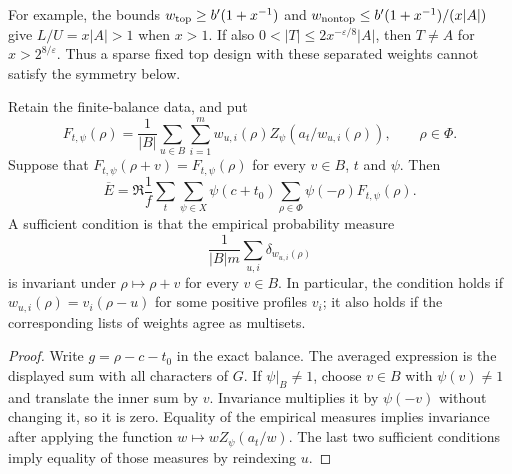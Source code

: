 For example, the bounds
$w_{\rm top}\ge b'(1+x^{-1})$ and
$w_{\rm nontop}\le b'(1+x^{-1})/(x|A|)$
give $L/U=x|A|>1$ when $x>1$.
If also $0<|T|\le2x^{-\varepsilon/8}|A|$, then $T\ne A$
for $x>2^{8/\varepsilon}$. Thus a sparse fixed top design with these
separated weights cannot satisfy the symmetry below.

\begin{lemma}
\label{cs-translation-symmetry}
Retain the finite-balance data, and put
\[
 F_{t,\psi}(\rho)=\frac1{|B|}\sum_{u\in B}\sum_{i=1}^m
 w_{u,i}(\rho)Z_\psi(a_t/w_{u,i}(\rho)),\qquad \rho\in\Phi.
\]
Suppose that $F_{t,\psi}(\rho+v)=F_{t,\psi}(\rho)$ for every
$v\in B$, $t$ and $\psi$. Then
\[
 \overline E=\Re\frac1f\sum_t\sum_{\psi\in X}\psi(c+t_0)
                   \sum_{\rho\in\Phi}\psi(-\rho)F_{t,\psi}(\rho).
\]
A sufficient condition is that the empirical probability measure
\[
 \frac1{|B|m}\sum_{u,i}\delta_{w_{u,i}(\rho)}
\]
is invariant under $\rho\mapsto\rho+v$ for every $v\in B$.
In particular, the condition holds if
$w_{u,i}(\rho)=v_i(\rho-u)$ for some positive profiles $v_i$;
it also holds if the corresponding lists of weights agree as multisets.
\end{lemma}
\begin{proof}
Write $g=\rho-c-t_0$ in the exact balance. The averaged expression
is the displayed sum with all characters of $G$. If $\psi|_B\ne1$,
choose $v\in B$ with $\psi(v)\ne1$ and translate the inner sum by $v$.
Invariance multiplies it by $\psi(-v)$ without changing it, so it is zero.
Equality of the empirical measures implies invariance after applying
the function $w\mapsto wZ_\psi(a_t/w)$. The last two sufficient
conditions imply equality of those measures by reindexing $u$.
\end{proof}

